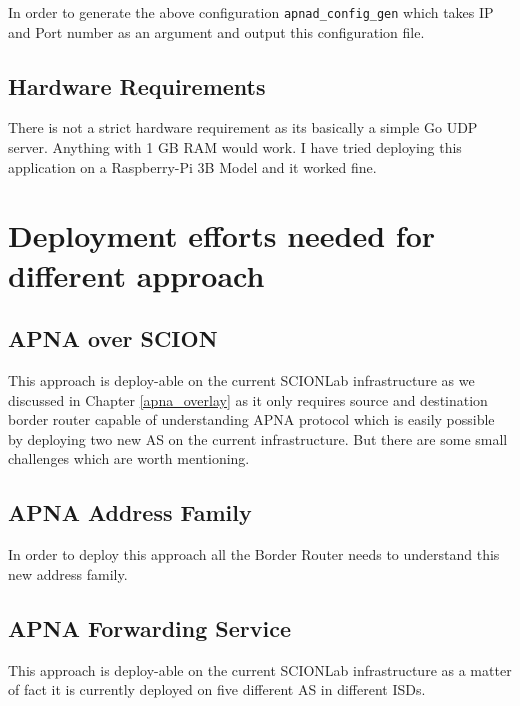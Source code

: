 In order to generate the above configuration \texttt{apnad\_config\_gen} which takes IP and Port number as an argument and output this configuration file.

\subsection{Hardware Requirements}
There is not a strict hardware requirement as its basically a simple Go UDP server. Anything with 1 GB RAM would work. I have tried deploying this application on a Raspberry-Pi 3B Model and it worked fine.

\section{Deployment efforts needed for different approach}

\subsection{APNA over SCION}
This approach is deploy-able on the current SCIONLab infrastructure as we discussed in Chapter \ref{apna_overlay} as it only requires source and destination border router capable of understanding APNA protocol which is easily possible by deploying two new AS on the current infrastructure. But there are some small challenges which are worth mentioning.

\subsection{APNA Address Family}
In order to deploy this approach all the Border Router needs to understand this new address family.

\subsection{APNA Forwarding Service}
This approach is deploy-able on the current SCIONLab infrastructure as a matter of fact it is currently deployed on five different AS in different ISDs.